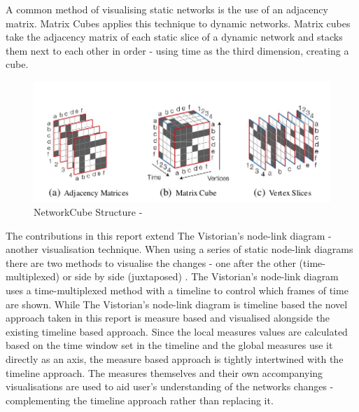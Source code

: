 A common method of visualising static networks is the use of an adjacency matrix. Matrix Cubes \cite{vdnwmc} applies this technique to dynamic networks. Matrix cubes take the adjacency matrix of each static slice of a dynamic network and stacks them next to each other in order - using time as the third dimension, creating a cube. 

\begin{figure}
\begin{center}
\includegraphics[trim={0 0 0 0}, width=140mm]{./Figures/networkCubePic.png}
\caption{NetworkCube Structure - \cite{vdnwmc}}
\end{center}
\end{figure}
\begin{center}
\end{center}

The contributions in this report extend The Vistorian's node-link diagram - another visualisation technique. When using a series of static node-link diagrams there are two methods to visualise the changes - one after the other (time-multiplexed) or side by side (juxtaposed) \cite{vdnwmc}. The Vistorian's node-link diagram uses a time-multiplexed method with a timeline to control which frames of time are shown. While The Vistorian's node-link diagram is timeline based the novel approach taken in this report is measure based and visualised alongside the existing timeline based approach. Since the local measures values are calculated based on the time window set in the timeline and the global measures use it directly as an axis, the measure based approach is tightly intertwined with the timeline approach. The measures themselves and their own accompanying visualisations are used to aid user's understanding of the networks changes - complementing the  timeline approach rather than replacing it.

